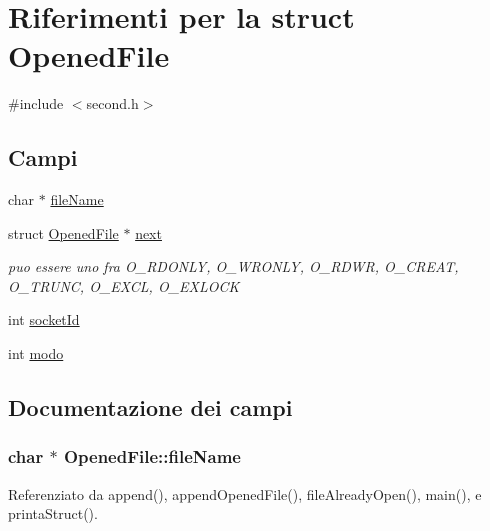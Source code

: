 \hypertarget{structOpenedFile}{}\section{Riferimenti per la struct Opened\+File}
\label{structOpenedFile}


{\ttfamily \#include $<$second.\+h$>$}

\subsection*{Campi}
\begin{DoxyCompactItemize}
\item 
char $\ast$ \hyperlink{structOpenedFile_abcff0610dfa8b1e3836b3f5bac40c8f5}{file\+Name}
\item 
struct \hyperlink{structOpenedFile}{Opened\+File} $\ast$ \hyperlink{structOpenedFile_a9b8c8b995cdda6da249a6ce9a9df98b2}{next}
\begin{DoxyCompactList}\small\item\em puo\textquotesingle{} essere uno fra O\+\_\+\+R\+D\+O\+N\+L\+Y, O\+\_\+\+W\+R\+O\+N\+L\+Y, O\+\_\+\+R\+D\+W\+R, O\+\_\+\+C\+R\+E\+A\+T, O\+\_\+\+T\+R\+U\+N\+C, O\+\_\+\+E\+X\+C\+L, O\+\_\+\+E\+X\+L\+O\+C\+K \end{DoxyCompactList}\item 
int \hyperlink{structOpenedFile_a2af35018ecff06dbd349d464c815038a}{socket\+Id}
\item 
int \hyperlink{structOpenedFile_a6d9f22ff6ba81506ba9c4a60f27c4f32}{modo}
\end{DoxyCompactItemize}


\subsection{Documentazione dei campi}
\hypertarget{structOpenedFile_abcff0610dfa8b1e3836b3f5bac40c8f5}{}
\subsubsection[{file\+Name}]{\setlength{\rightskip}{0pt plus 5cm}char $\ast$ Opened\+File\+::file\+Name}\label{structOpenedFile_abcff0610dfa8b1e3836b3f5bac40c8f5}


Referenziato da append(), append\+Opened\+File(), file\+Already\+Open(), main(), e printa\+Struct().

